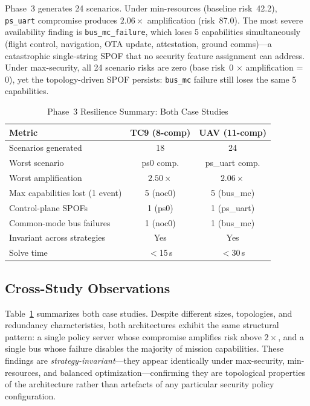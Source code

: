 \documentclass[conference]{IEEEtran}
\begin{document}
Phase~3 generates 24 scenarios. Under min-resources (baseline risk~42.2),
\texttt{ps\_uart} compromise produces $2.06\times$ amplification
(risk~87.0). The most severe availability finding is
\texttt{bus\_mc\_failure}, which loses 5 capabilities simultaneously
(flight control, navigation, OTA update, attestation, ground comms)---a
catastrophic single-string SPOF that no security feature assignment can
address. Under max-security, all 24 scenario risks are zero (base risk~0
$\times$ amplification = 0), yet the topology-driven SPOF persists:
\texttt{bus\_mc} failure still loses the same 5 capabilities.

\begin{table}[t]
\caption{Phase~3 Resilience Summary: Both Case Studies}
\label{tab:resilience}
\centering
\scriptsize
\setlength{\tabcolsep}{3pt}
\begin{tabular}{lcc}
\toprule
Metric & TC9 (8-comp) & UAV (11-comp) \\
\midrule
Scenarios generated          & 18          & 24 \\
Worst scenario               & ps0 comp.   & ps\_uart comp. \\
Worst amplification          & $2.50\times$& $2.06\times$ \\
Max capabilities lost (1 event) & 5 (noc0) & 5 (bus\_mc) \\
Control-plane SPOFs          & 1 (ps0)     & 1 (ps\_uart) \\
Common-mode bus failures     & 1 (noc0)    & 1 (bus\_mc) \\
Invariant across strategies  & Yes         & Yes \\
Solve time                   & $<$15\,s    & $<$30\,s \\
\bottomrule
\end{tabular}
\end{table}

\subsection{Cross-Study Observations}

Table~\ref{tab:resilience} summarizes both case studies. Despite different
sizes, topologies, and redundancy characteristics, both architectures
exhibit the same structural pattern: a single policy server whose
compromise amplifies risk above $2\times$, and a single bus whose failure
disables the majority of mission capabilities. These findings are
\emph{strategy-invariant}---they appear identically under max-security,
min-resources, and balanced optimization---confirming they are topological
properties of the architecture rather than artefacts of any particular
security policy configuration.
\end{document}
